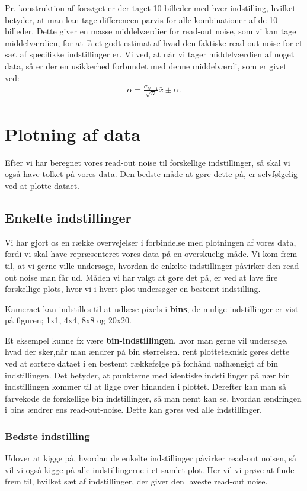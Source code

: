 \documentclass[working]{tuftebook}
\begin{document}
Pr. konstruktion af forsøget er der taget 10 billeder med hver indstilling, hvilket betyder, at man kan tage differencen parvis for alle kombinationer af de 10 billeder. Dette giver en masse middelværdier for read-out noise, som vi kan tage middelværdien, for at få et godt estimat af hvad den faktiske read-out noise for et sæt af specifikke indstillinger er. Vi ved, at når vi tager middelværdien af noget data, så er der en usikkerhed forbundet med denne middelværdi, som er givet ved:
\begin{align*}
\alpha = \frac{\sigma_{N-1}}{\sqrt{N}}
\bar{x}\pm \alpha
.\end{align*}
\section{Plotning af data}
Efter vi har beregnet vores read-out noise til forskellige indstillinger, så skal vi også have tolket på vores data. Den bedste måde at gøre dette på, er selvfølgelig ved at plotte dataet. 

\subsection{Enkelte indstillinger}
Vi har gjort os en række overvejelser i forbindelse med plotningen af vores data, fordi vi skal have repræsenteret vores data på en overskuelig måde. Vi kom frem til, at vi gerne ville undersøge, hvordan de enkelte indstillinger påvirker den read-out noise man får ud. Måden vi har valgt at gøre det på, er ved at lave fire forskellige plots, hvor vi i hvert plot undersøger en bestemt indstilling. 
\\
\begin{marginfigure}[-100pt]
    \centering
    \caption{Kameraet kan indstilles til at udlæse pixels i \textbf{bins}, de mulige indstillinger er vist på figuren; 1x1, 4x4, 8x8 og 20x20. }
    \label{fig:bins}
\end{marginfigure}
Et eksempel kunne fx være \textbf{bin-indstillingen}, hvor man gerne vil undersøge, hvad der sker,når man ændrer på bin størrelsen. rent plotteteknisk gøres dette ved at sortere dataet i en bestemt rækkefølge på forhånd uafhængigt af bin indstillingen. Det betyder, at punkterne med identiske indstillinger på nær bin indstillingen kommer til at ligge over hinanden i plottet. Derefter kan man så farvekode de forskellige bin indstillinger, så man nemt kan se, hvordan ændringen i bins ændrer ens read-out-noise. Dette kan gøres ved alle indstillinger.
\subsubsection*{Bedste indstilling}
Udover at kigge på, hvordan de enkelte indstillinger påvirker read-out noisen, så  vil vi også kigge på alle indstillingerne i et samlet plot. Her vil vi prøve at finde frem til, hvilket sæt af indstillinger, der giver den laveste read-out noise.
\end{document}
